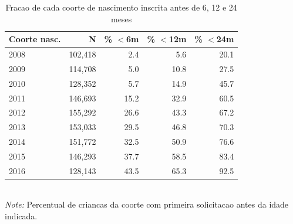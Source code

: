 \begin{table}[htbp]\centering
\caption{Fracao de cada coorte de nascimento inscrita antes de 6, 12 e 24 meses}
\label{tab:R3b_precoce}
\small
\begin{tabular}{lrrrr}
\toprule
Coorte nasc. & N & \% $<$6m & \% $<$12m & \% $<$24m \\
\midrule
2008 & 102,418 & 2.4 & 5.6 & 20.1 \\
2009 & 114,708 & 5.0 & 10.8 & 27.5 \\
2010 & 128,352 & 5.7 & 14.9 & 45.7 \\
2011 & 146,693 & 15.2 & 32.9 & 60.5 \\
2012 & 155,292 & 26.6 & 43.3 & 67.2 \\
2013 & 153,033 & 29.5 & 46.8 & 70.3 \\
2014 & 151,772 & 32.5 & 50.9 & 76.6 \\
2015 & 146,293 & 37.7 & 58.5 & 83.4 \\
2016 & 128,143 & 43.5 & 65.3 & 92.5 \\
\bottomrule
\end{tabular}
\\[3pt]{\footnotesize \textit{Note:} Percentual de criancas da coorte com primeira solicitacao antes da idade indicada.}
\end{table}
